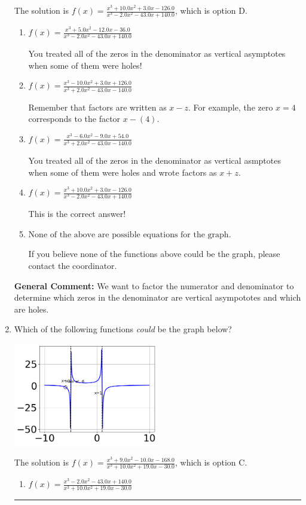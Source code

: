 \documentclass{extbook}[14pt]
\newcommand{\litem}[1]{\item #1

\rule{\textwidth}{0.4pt}}
\begin{document}
\begin{enumerate}
{The solution is \( f(x)=\frac{x^{3} +10.0 x^{2} +3.0 x -126.0}{x^{3} -2.0 x^{2} -43.0 x + 140.0} \), which is option D.\begin{enumerate}[label=\Alph*.]
\item \( f(x)=\frac{x^{3} +5.0 x^{2} -12.0 x -36.0}{x^{3} -2.0 x^{2} -43.0 x + 140.0} \)

You treated all of the zeros in the denominator as vertical asymptotes when some of them were holes!
\item \( f(x)=\frac{x^{3} -10.0 x^{2} +3.0 x + 126.0}{x^{3} +2.0 x^{2} -43.0 x -140.0} \)

Remember that factors are written as $x-z$. For example, the zero $x=4$ corresponds to the factor $x-(4)$.
\item \( f(x)=\frac{x^{3} -6.0 x^{2} -9.0 x + 54.0}{x^{3} +2.0 x^{2} -43.0 x -140.0} \)

You treated all of the zeros in the denominator as vertical asmptotes when some of them were holes and wrote factors as $x+z$.
\item \( f(x)=\frac{x^{3} +10.0 x^{2} +3.0 x -126.0}{x^{3} -2.0 x^{2} -43.0 x + 140.0} \)

This is the correct answer!
\item \( \text{None of the above are possible equations for the graph.} \)

If you believe none of the functions above could be the graph, please contact the coordinator.
\end{enumerate}

\textbf{General Comment:} We want to factor the numerator and denominator to determine which zeros in the denominator are vertical asympototes and which are holes.
}
\litem{
Which of the following functions \textit{could} be the graph below?

\begin{center}
    \includegraphics[width=0.5\textwidth]{../Figures/identifyGraphOfRationalFunctionC.png}
\end{center}


The solution is \( f(x)=\frac{x^{3} +9.0 x^{2} -10.0 x -168.0}{x^{3} +10.0 x^{2} +19.0 x -30.0} \), which is option C.\begin{enumerate}[label=\Alph*.]
\item \( f(x)=\frac{x^{3} -2.0 x^{2} -43.0 x + 140.0}{x^{3} +10.0 x^{2} +19.0 x -30.0} \)


\end{enumerate}}
\end{enumerate}
\end{document}
